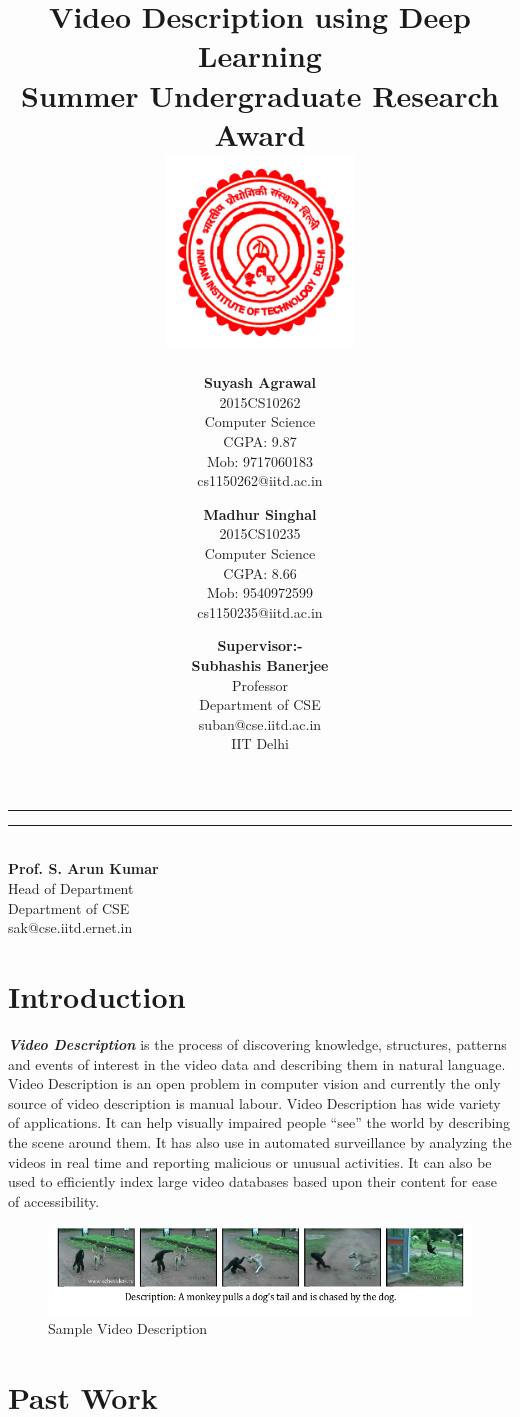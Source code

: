 \documentclass[12pt]{article}
\title{\vspace*{\fill} \textbf{Video Description using Deep Learning}
	  \\ {\large \textbf{Summer Undergraduate Research Award}}
	  \\  \vspace{3mm} \includegraphics[width=5cm]{logo.jpg}}
\author{
	\textbf{Suyash Agrawal}\\ 
	2015CS10262\\
	Computer Science\\
	CGPA: 9.87 \\
	Mob: 9717060183\\
	cs1150262@iitd.ac.in
	\and
	\textbf{Madhur Singhal}\\ 
	2015CS10235\\
	Computer Science\\
	CGPA: 8.66\\
	Mob: 9540972599\\
	cs1150235@iitd.ac.in
}
\date{\textbf{Supervisor:-} \\ \textbf{Subhashis Banerjee} \\ Professor \\ Department of CSE \\ suban@cse.iitd.ac.in\\ IIT Delhi\\
\vspace*{\fill}}
\begin{document}
	\maketitle

\begin{center}
\noindent\rule{3.2cm}{0.4pt} 
\end{center}

\begin{flushright}
\noindent\rule{3.2cm}{0.4pt} 
\\ \textbf{Prof. S. Arun Kumar}
\\ Head of Department
\\ Department of CSE
\\ sak@cse.iitd.ernet.in
\end{flushright}


	\newpage

	\section{Introduction}
		\textit{\textbf{Video Description}} is the process of discovering knowledge, structures, patterns and events of interest in the video data and describing them in natural language. Video Description is an open problem in computer vision and currently the only source of video description is manual labour. 
		\newline
		Video Description has wide variety of applications. It can help visually impaired people ``see'' the world by describing the scene around them. It has also use in automated surveillance by analyzing the videos in real time and reporting malicious or unusual activities. It can also be used to efficiently index large video databases based upon their content for ease of accessibility.

		\begin{figure}[ht!]
		\centering
		\includegraphics[width=1.0\textwidth]{description.png}
		\caption{Sample Video Description\label{fig0}}
		\end{figure}		


	\section{Past Work}
\end{document}
